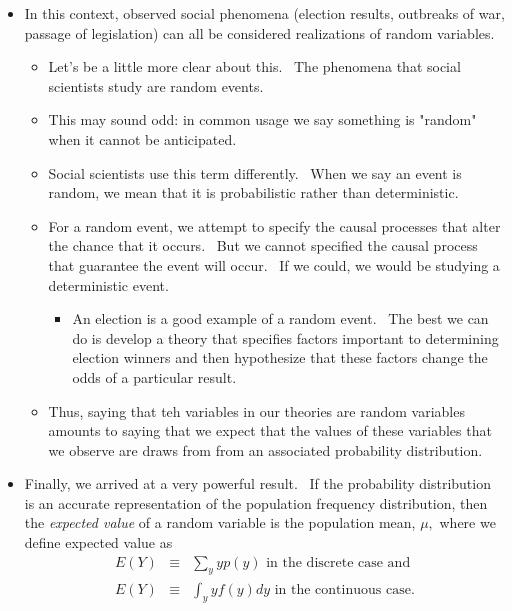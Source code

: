 \documentclass[11pt]{article}
\begin{document}
\begin{itemize}
\item In this context, observed social phenomena (election results,
outbreaks of war, passage of legislation) can all be considered realizations
of random variables.

\begin{itemize}
\item Let's be a little more clear about this. \ The phenomena that social
scientists study are random events.

\item This may sound odd: in common usage we say something is "random" when
it cannot be anticipated.

\item Social scientists use this term differently. \ When we say an event is
random, we mean that it is probabilistic rather than deterministic.

\item For a random event, we attempt to specify the causal processes that
alter the chance that it occurs. \ But we cannot specified the causal
process that guarantee the event will occur. \ If we could, we would be
studying a deterministic event.

\begin{itemize}
\item An election is a good example of a random event. \ The best we can do
is develop a theory that specifies factors important to determining election
winners and then hypothesize that these factors change the odds of a
particular result.
\end{itemize}

\item Thus, saying that teh variables in our theories are random variables
amounts to saying that we expect that the values of these variables that we
observe are draws from from an associated probability distribution.
\end{itemize}

\item Finally, we arrived at a very powerful result. \ If the probability
distribution is an accurate representation of the population frequency
distribution, then the \textit{expected value }of a random variable is the
population mean, $\mu ,$ where we define expected value as%
\begin{eqnarray*}
E\left( Y\right) &\equiv &\sum_{y}yp\left( y\right) \text{ in the discrete
case and} \\
E\left( Y\right) &\equiv &\int_{y}yf\left( y\right) dy\text{ in the
continuous case.}
\end{eqnarray*}%
\ 


\end{itemize}
\end{document}
